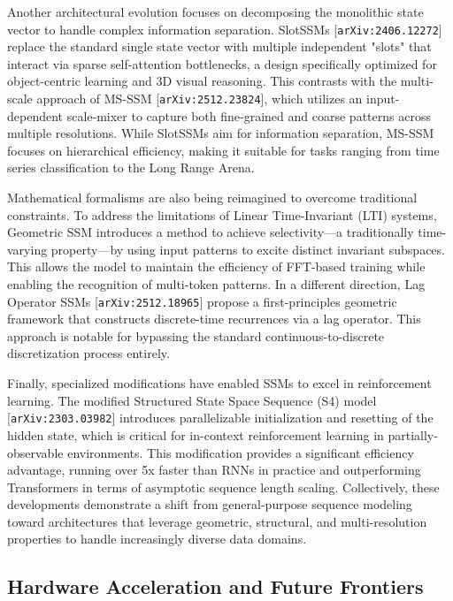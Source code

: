 \documentclass[11pt]{article}
\begin{document}
Another architectural evolution focuses on decomposing the monolithic state vector to handle complex information separation. SlotSSMs [\texttt{arXiv:2406.12272}] replace the standard single state vector with multiple independent "slots" that interact via sparse self-attention bottlenecks, a design specifically optimized for object-centric learning and 3D visual reasoning. This contrasts with the multi-scale approach of MS-SSM [\texttt{arXiv:2512.23824}], which utilizes an input-dependent scale-mixer to capture both fine-grained and coarse patterns across multiple resolutions. While SlotSSMs aim for information separation, MS-SSM focuses on hierarchical efficiency, making it suitable for tasks ranging from time series classification to the Long Range Arena.

Mathematical formalisms are also being reimagined to overcome traditional constraints. To address the limitations of Linear Time-Invariant (LTI) systems, Geometric SSM introduces a method to achieve selectivity—a traditionally time-varying property—by using input patterns to excite distinct invariant subspaces. This allows the model to maintain the efficiency of FFT-based training while enabling the recognition of multi-token patterns. In a different direction, Lag Operator SSMs [\texttt{arXiv:2512.18965}] propose a first-principles geometric framework that constructs discrete-time recurrences via a lag operator. This approach is notable for bypassing the standard continuous-to-discrete discretization process entirely.

Finally, specialized modifications have enabled SSMs to excel in reinforcement learning. The modified Structured State Space Sequence (S4) model [\texttt{arXiv:2303.03982}] introduces parallelizable initialization and resetting of the hidden state, which is critical for in-context reinforcement learning in partially-observable environments. This modification provides a significant efficiency advantage, running over 5x faster than RNNs in practice and outperforming Transformers in terms of asymptotic sequence length scaling. Collectively, these developments demonstrate a shift from general-purpose sequence modeling toward architectures that leverage geometric, structural, and multi-resolution properties to handle increasingly diverse data domains.

\subsection{Hardware Acceleration and Future Frontiers}
\end{document}
